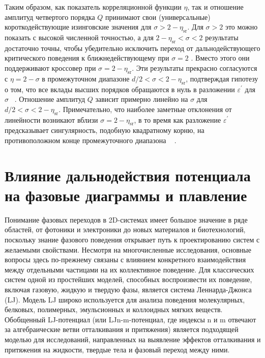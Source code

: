 Таким образом, как показатель корреляционной функции $\eta$, так и отношение амплитуд четвертого порядка $Q$ принимают свои (универсальные) короткодействующие изинговские значения для $\sigma>2-\eta_{\mathrm{sr}}$. Для $\sigma>2$ это можно показать с высокой численной точностью, а для $2-\eta_{\mathrm{sr}}<\sigma<2$ результаты достаточно точны, чтобы убедительно исключить переход от дальнодействующего критического поведения к ближнедействующему при $\sigma=2$ . Вместо этого они поддерживают кроссовер при $\sigma=2-\eta_{\mathrm{sr}}$. 
Эти результаты прекрасно согласуются с $\eta=2-\sigma$ в промежуточном диапазоне $d/2<\sigma<2-\eta_{\mathrm{sr}}$, подтверждая гипотезу о том, что все вклады высших порядков обращаются в нуль в разложении $\varepsilon^{\prime}$ для $\sigma$ ~\cite{10.1103/PhysRevLett.29.917}. Отношение амплитуд $Q$ зависит примерно линейно на $\sigma$ для $d/2<\sigma<2-\eta_{\mathrm{sr}}$. 
Примечательно, что наиболее заметные отклонения от линейности возникают вблизи $\sigma=2-\eta_{\mathrm{sr}}$, в то время как разложение $\varepsilon^{\prime}$ предсказывает сингулярность, подобную квадратному корню, на противоположном конце промежуточного диапазона ~ \cite{10.1103/PhysRevE.60.7558}.


\section{Влияние дальнодействия потенциала на фазовые диаграммы и плавление}

Понимание фазовых переходов в 2D-системах имеет большое значение в ряде областей, от фотоники и электроники до новых материалов и биотехнологий, поскольку знание фазового поведения открывает путь к проектированию систем с желаемыми свойствами. Несмотря на многочисленные исследования, основные вопросы здесь по-прежнему связаны с влиянием конкретного взаимодействия между отдельными частицами на их коллективное поведение. Для классических систем одной из простейших моделей, способных воспроизвести их поведение, включая газовую, жидкую и твердую фазы, является система Леннарда-Джонса (LJ). Модель LJ широко используется для анализа поведения молекулярных, белковых, полимерных, эмульсионных и коллоидных мягких веществ. Обобщенный LJ-потенциал (или LJn-m-потенциал, где индексы n и m отвечают за алгебраические ветви отталкивания и притяжения) является подходящей моделью для исследований, направленных на выявление эффектов отталкивания и притяжения на жидкости, твердые тела и фазовый переход между ними.

